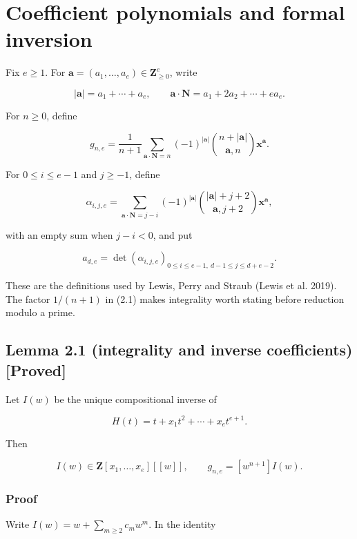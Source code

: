 \documentclass[
]{article}
\begin{document}
\section{Coefficient polynomials and formal
inversion}\label{coefficient-polynomials-and-formal-inversion}

Fix \(e\ge1\). For \(\mathbf a=(a_1,\ldots,a_e)\in\mathbf Z_{\ge0}^e\),
write

\[
|\mathbf a|=a_1+\cdots+a_e,
\qquad
\mathbf a\!\cdot\!\mathbf N=a_1+2a_2+\cdots+ea_e.
\]

For \(n\ge0\), define

\[
g_{n,e}=\frac1{n+1}
\sum_{\mathbf a\cdot\mathbf N=n}
(-1)^{|\mathbf a|}
\binom{n+|\mathbf a|}{\mathbf a,n}\mathbf x^{\mathbf a}.
\tag{2.1}
\]

For \(0\le i\le e-1\) and \(j\ge-1\), define

\[
\alpha_{i,j,e}=
\sum_{\mathbf a\cdot\mathbf N=j-i}
(-1)^{|\mathbf a|}
\binom{|\mathbf a|+j+2}{\mathbf a,j+2}\mathbf x^{\mathbf a},
\tag{2.2}
\]

with an empty sum when \(j-i<0\), and put

\[
a_{d,e}=\det(\alpha_{i,j,e})_{
0\le i\le e-1,\ d-1\le j\le d+e-2}.
\tag{2.3}
\]

These are the definitions used by Lewis, Perry and Straub (Lewis et al.
2019). The factor \(1/(n+1)\) in (2.1) makes integrality worth stating
before reduction modulo a prime.

\subsection*{Lemma 2.1 (integrality and inverse coefficients)
{[}Proved{]}}\label{lemma-2.1-integrality-and-inverse-coefficients-proved}

Let \(I(w)\) be the unique compositional inverse of

\[
H(t)=t+x_1t^2+\cdots+x_et^{e+1}.
\]

Then

\[
I(w)\in\mathbf Z[x_1,\ldots,x_e][[w]],
\qquad
g_{n,e}=[w^{n+1}]I(w).
\tag{2.4}
\]

\subsubsection*{Proof}\label{proof}

Write \(I(w)=w+\sum_{m\ge2}c_mw^m\). In the identity
\end{document}
